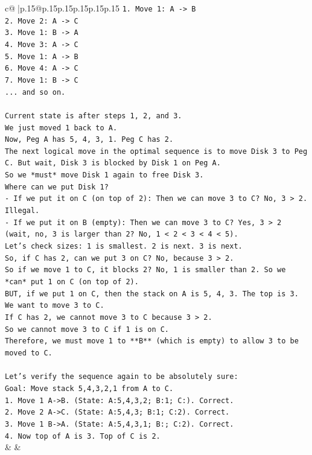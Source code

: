 \documentclass{article}
\begin{document}
{\begin{supertabular}{c@{$\;$}|p{.15\linewidth}@{}p{.15\linewidth}p{.15\linewidth}p{.15\linewidth}p{.15\linewidth}p{.15\linewidth}}
{{{\texttt{1. Move 1: A {-}> B} \\
\texttt{2. Move 2: A {-}> C} \\
\texttt{3. Move 1: B {-}> A} \\
\texttt{4. Move 3: A {-}> C} \\
\texttt{5. Move 1: A {-}> B} \\
\texttt{6. Move 4: A {-}> C} \\
\texttt{7. Move 1: B {-}> C} \\
\texttt{... and so on.} \\
\\ 
\texttt{Current state is after steps 1, 2, and 3.} \\
\texttt{We just moved 1 back to A.} \\
\texttt{Now, Peg A has 5, 4, 3, 1. Peg C has 2.} \\
\texttt{The next logical move in the optimal sequence is to move Disk 3 to Peg C. But wait, Disk 3 is blocked by Disk 1 on Peg A.} \\
\texttt{So we *must* move Disk 1 again to free Disk 3.} \\
\texttt{Where can we put Disk 1?} \\
\texttt{{-} If we put it on C (on top of 2): Then we can move 3 to C? No, 3 > 2. Illegal.} \\
\texttt{{-} If we put it on B (empty): Then we can move 3 to C? Yes, 3 > 2 (wait, no, 3 is larger than 2? No, 1 < 2 < 3 < 4 < 5).} \\
\texttt{Let's check sizes: 1 is smallest. 2 is next. 3 is next.} \\
\texttt{So, if C has 2, can we put 3 on C? No, because 3 > 2.} \\
\texttt{So if we move 1 to C, it blocks 2? No, 1 is smaller than 2. So we *can* put 1 on C (on top of 2).} \\
\texttt{BUT, if we put 1 on C, then the stack on A is 5, 4, 3. The top is 3.} \\
\texttt{We want to move 3 to C.} \\
\texttt{If C has 2, we cannot move 3 to C because 3 > 2.} \\
\texttt{So we cannot move 3 to C if 1 is on C.} \\
\texttt{Therefore, we must move 1 to **B** (which is empty) to allow 3 to be moved to C.} \\
\\ 
\texttt{Let's verify the sequence again to be absolutely sure:} \\
\texttt{Goal: Move stack 5,4,3,2,1 from A to C.} \\
\texttt{1. Move 1 A{-}>B. (State: A:5,4,3,2; B:1; C:). Correct.} \\
\texttt{2. Move 2 A{-}>C. (State: A:5,4,3; B:1; C:2). Correct.} \\
\texttt{3. Move 1 B{-}>A. (State: A:5,4,3,1; B:; C:2). Correct.} \\
\texttt{4. Now top of A is 3. Top of C is 2.} \\
            }
        }
    }
    & & \\ \\


\end{supertabular}}
\end{document}
